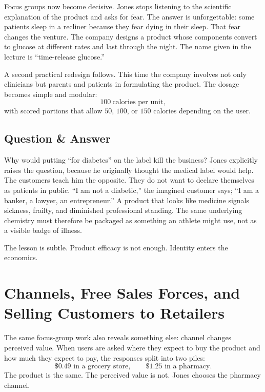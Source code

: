 Focus groups now become decisive. Jones stops listening to the scientific explanation of the product and asks for fear. The answer is unforgettable: some patients sleep in a recliner because they fear dying in their sleep. That fear changes the venture. The company designs a product whose components convert to glucose at different rates and last through the night. The name given in the lecture is ``time-release glucose.''

A second practical redesign follows. This time the company involves not only clinicians but parents and patients in formulating the product. The dosage becomes simple and modular:
\begin{equation}
100\ \text{calories per unit},
\end{equation}
with scored portions that allow \(50\), \(100\), or \(150\) calories depending on the user.

\subsection{Question \& Answer}

Why would putting ``for diabetes'' on the label kill the business? Jones explicitly raises the question, because he originally thought the medical label would help. The customers teach him the opposite. They do not want to declare themselves as patients in public. ``I am not a diabetic,'' the imagined customer says; ``I am a banker, a lawyer, an entrepreneur.'' A product that looks like medicine signals sickness, frailty, and diminished professional standing. The same underlying chemistry must therefore be packaged as something an athlete might use, not as a visible badge of illness.

The lesson is subtle. Product efficacy is not enough. Identity enters the economics.

\section{Channels, Free Sales Forces, and Selling Customers to Retailers}

The same focus-group work also reveals something else: channel changes perceived value. When users are asked where they expect to buy the product and how much they expect to pay, the responses split into two piles:
\begin{equation}
\$0.49 \text{ in a grocery store},
\qquad
\$1.25 \text{ in a pharmacy.}
\end{equation}
The product is the same. The perceived value is not. Jones chooses the pharmacy channel.

